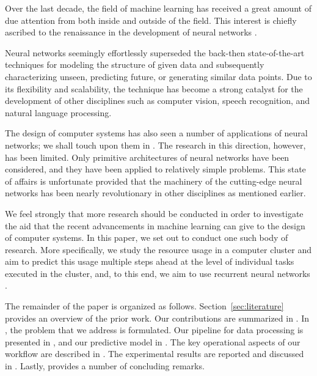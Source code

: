 Over the last decade, the field of machine learning has received a great amount
of due attention from both inside and outside of the field. This interest is
chiefly ascribed to the renaissance in the development of neural networks
\cite{goodfellow2016}.

Neural networks seemingly effortlessly superseded the back-then state-of-the-art
techniques for modeling the structure of given data and subsequently
characterizing unseen, predicting future, or generating similar data points. Due
to its flexibility and scalability, the technique has become a strong catalyst
for the development of other disciplines such as computer vision, speech
recognition, and natural language processing.

The design of computer systems has also seen a number of applications of neural
networks; we shall touch upon them in . The research in this
direction, however, has been limited. Only primitive architectures of neural
networks have been considered, and they have been applied to relatively simple
problems. This state of affairs is unfortunate provided that the machinery of
the cutting-edge neural networks has been nearly revolutionary in other
disciplines as mentioned earlier.

We feel strongly that more research should be conducted in order to investigate
the aid that the recent advancements in machine learning can give to the design
of computer systems. In this paper, we set out to conduct one such body of
research. More specifically, we study the resource usage in a computer cluster
and aim to predict this usage multiple steps ahead at the level of individual
tasks executed in the cluster, and, to this end, we aim to use recurrent neural
networks \cite{goodfellow2016}.

The remainder of the paper is organized as follows. Section~\ref{sec:literature}
provides an overview of the prior work. Our contributions are summarized in
. In , the problem that we address is
formulated. Our pipeline for data processing is presented in , and
our predictive model in . The key operational aspects of our
workflow are described in . The experimental results are
reported and discussed in . Lastly,  provides a
number of concluding remarks.
